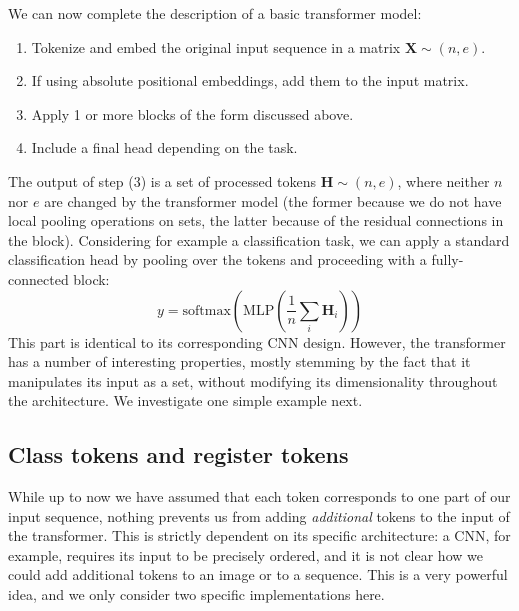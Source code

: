 We can now complete the description of a basic transformer model:
%
\begin{enumerate}
\item Tokenize and embed the original input sequence in a matrix $\mathbf{X} \sim (n,e)$.\
\item If using absolute positional embeddings, add them to the input matrix.
\item Apply 1 or more blocks of the form discussed above.
\item Include a final head depending on the task.
\end{enumerate}
%
The output of step (3) is a set of processed tokens $\mathbf{H} \sim (n,e)$, where neither $n$ nor $e$ are changed by the transformer model (the former because we do not have local pooling operations on sets, the latter because of the residual connections in the block). Considering for example a classification task, we can apply a standard classification head by pooling over the tokens and proceeding with a fully-connected block:
%
$$
y=\text{softmax}\left(\text{MLP}\left(\frac{1}{n}\sum_i\mathbf{H}_i\right)\right)
$$
%
This part is identical to its corresponding CNN design. However, the transformer has a number of interesting properties, mostly stemming by the fact that it manipulates its input as a set, without modifying its dimensionality throughout the architecture. We investigate one simple example next.

\subsection{Class tokens and register tokens}
\label{subsec:class_register_tokens}

While up to now we have assumed that each token corresponds to one part of our input sequence, nothing prevents us from adding \textit{additional} tokens to the input of the transformer. This is strictly dependent on its specific architecture: a CNN, for example, requires its input to be precisely ordered, and it is not clear how we could add additional tokens to an image or to a sequence. This is a very powerful idea, and we only consider two specific implementations here.

